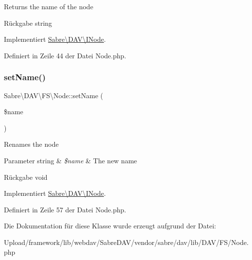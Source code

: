 Returns the name of the node

\begin{DoxyReturn}{Rückgabe}
string 
\end{DoxyReturn}


Implementiert \mbox{\hyperlink{interface_sabre_1_1_d_a_v_1_1_i_node_ab616fe836b1ae36af12126a2bc934dce}{Sabre\textbackslash{}\+D\+A\+V\textbackslash{}\+I\+Node}}.



Definiert in Zeile 44 der Datei Node.\+php.

\mbox{\label{class_sabre_1_1_d_a_v_1_1_f_s_1_1_node_a9a4cd0359942b6640637502788bcc6d8}} 
\subsubsection{\texorpdfstring{set\+Name()}{setName()}}
{\footnotesize\ttfamily Sabre\textbackslash{}\+D\+A\+V\textbackslash{}\+F\+S\textbackslash{}\+Node\+::set\+Name (\begin{DoxyParamCaption}\item[{}]{\$name }\end{DoxyParamCaption})}

Renames the node


\begin{DoxyParams}[1]{Parameter}
string & {\em \$name} & The new name \\
\hline
\end{DoxyParams}
\begin{DoxyReturn}{Rückgabe}
void 
\end{DoxyReturn}


Implementiert \mbox{\hyperlink{interface_sabre_1_1_d_a_v_1_1_i_node_ac90fa5526e98def2e1f51bc57a772366}{Sabre\textbackslash{}\+D\+A\+V\textbackslash{}\+I\+Node}}.



Definiert in Zeile 57 der Datei Node.\+php.



Die Dokumentation für diese Klasse wurde erzeugt aufgrund der Datei\+:\begin{DoxyCompactItemize}
\item 
Upload/framework/lib/webdav/\+Sabre\+D\+A\+V/vendor/sabre/dav/lib/\+D\+A\+V/\+F\+S/Node.\+php\end{DoxyCompactItemize}
